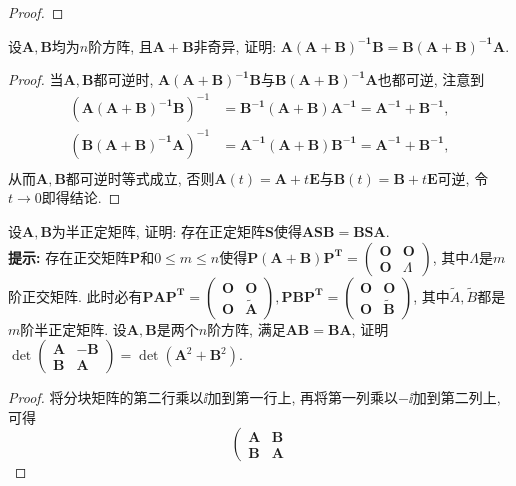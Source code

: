 \begin{quizb}
\begin{proof}
\end{proof}
\woe 设\(\boldsymbol{A},\boldsymbol{B}\)均为\(n\)阶方阵, 且\(\boldsymbol{A+B}\)非奇异, 证明: \(\boldsymbol{A(A+B)^{-1}B=B(A+B)^{-1}A}.\)
\begin{proof}
当\(\boldsymbol{A,B}\)都可逆时, \(\boldsymbol{A(A+B)^{-1}B}\)与\(\boldsymbol{B(A+B)^{-1}A}\)也都可逆, 注意到\[\begin{split}
\left(\boldsymbol{A(A+B)^{-1}B}\right)^{-1}&=\boldsymbol{B^{-1}}\left(\boldsymbol{A+B}\right)\boldsymbol{A^{-1}}=\boldsymbol{A^{-1}}+\boldsymbol{B^{-1}},\\
\left(\boldsymbol{B(A+B)^{-1}A}\right)^{-1}&=\boldsymbol{A^{-1}}\left(\boldsymbol{A+B}\right)\boldsymbol{B^{-1}}=\boldsymbol{A^{-1}}+\boldsymbol{B^{-1}},\\
\end{split}\]从而\(\boldsymbol{A,B}\)都可逆时等式成立, 否则\(\boldsymbol{A}(t)=\boldsymbol{A}+t\boldsymbol{E}\)与\(\boldsymbol{B}(t)=\boldsymbol{B}+t\boldsymbol{E}\)可逆, 令\(t\rightarrow 0\)即得结论.
\end{proof}
\woe 设\(\boldsymbol{A,B}\)为半正定矩阵, 证明: 存在正定矩阵\(\boldsymbol{S}\)使得\(\boldsymbol{ASB=BSA}.\)\\
\textbf{提示: }存在正交矩阵\(\boldsymbol{P}\)和\(0\leqslant m\leqslant n\)使得\(\boldsymbol{P(A+B)P^{T}=\left(\begin{matrix}
        O&O\\O&\varLambda
\end{matrix}\right)}\), 其中\(\boldsymbol{\varLambda}\)是\(m\)阶正交矩阵. 此时必有\(\boldsymbol{PAP^{T}=\left(\begin{matrix}
O&O\\O&\tilde{A}
\end{matrix}\right),PBP^{T}=\left(\begin{matrix}
O&O\\O&\tilde{B}
\end{matrix}\right)}\), 其中\(\tilde{A},\tilde{B}\)都是\(m\)阶半正定矩阵.
\woe 设\(\boldsymbol{A,B}\)是两个\(n\)阶方阵, 满足\(\boldsymbol{AB=BA}\), 证明\(\det\left(\begin{matrix}
    \boldsymbol{A}&\boldsymbol{-B}\\\boldsymbol{B}&\boldsymbol{A}
\end{matrix}\right)=\det\left(\boldsymbol{A}^2+\boldsymbol{B}^2\right)\).
\begin{proof}
将分块矩阵的第二行乘以\(\ii\)加到第一行上, 再将第一列乘以\(-\ii\)加到第二列上, 可得\[\left(\begin{matrix}
\boldsymbol{A}&\boldsymbol{B}\\\boldsymbol{B}&\boldsymbol{A}

\end{matrix}\]
\end{proof}
\end{quizb}
